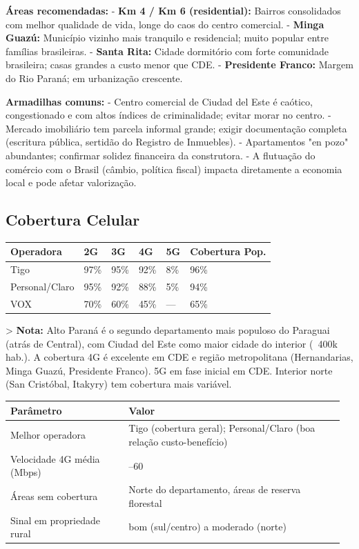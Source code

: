 \textbf{Áreas recomendadas:}
- \textbf{Km 4 / Km 6 (residential):} Bairros consolidados com melhor qualidade de vida, longe do caos do centro comercial.
- \textbf{Minga Guazú:} Município vizinho mais tranquilo e residencial; muito popular entre famílias brasileiras.
- \textbf{Santa Rita:} Cidade dormitório com forte comunidade brasileira; casas grandes a custo menor que CDE.
- \textbf{Presidente Franco:} Margem do Rio Paraná; em urbanização crescente.

\textbf{Armadilhas comuns:}
- Centro comercial de Ciudad del Este é caótico, congestionado e com altos índices de criminalidade; evitar morar no centro.
- Mercado imobiliário tem parcela informal grande; exigir documentação completa (escritura pública, sertidão do Registro de Inmuebles).
- Apartamentos "en pozo" abundantes; confirmar solidez financeira da construtora.
- A flutuação do comércio com o Brasil (câmbio, política fiscal) impacta diretamente a economia local e pode afetar valorização.




\subsection{Cobertura Celular}



{\small
\setlength{\tabcolsep}{3pt}
\renewcommand{\arraystretch}{1.12}
{\small
\begin{tabularx}{\linewidth}{lXXXXX}
\toprule
Operadora & 2G & 3G & 4G & 5G & Cobertura Pop. \\
\midrule
Tigo & 97\% & 95\% & 92\% & 8\% & 96\% \\
Personal/Claro & 95\% & 92\% & 88\% & 5\% & 94\% \\
VOX & 70\% & 60\% & 45\% & --- & 65\% \\
\bottomrule
\end{tabularx}
}
}

> \textbf{Nota:} Alto Paraná é o segundo departamento mais populoso do Paraguai (atrás de Central), com Ciudad del Este como maior cidade do interior (~400k hab.). A cobertura 4G é excelente em CDE e região metropolitana (Hernandarias, Minga Guazú, Presidente Franco). 5G em fase inicial em CDE. Interior norte (San Cristóbal, Itakyry) tem cobertura mais variável.


{\small
\setlength{\tabcolsep}{3pt}
\renewcommand{\arraystretch}{1.12}
\begin{tabularx}{\linewidth}{>{\raggedright\arraybackslash}p{0.34\linewidth} >{\raggedright\arraybackslash}p{0.62\linewidth}}
\toprule
Parâmetro & Valor \\
\midrule
Melhor operadora & Tigo (cobertura geral); Personal/Claro (boa relação custo-benefício) \\
Velocidade 4G média (Mbps) & 35--60 \\
Áreas sem cobertura & Norte do departamento, áreas de reserva florestal \\
Sinal em propriedade rural & bom (sul/centro) a moderado (norte) \\
\bottomrule
\end{tabularx}
}


